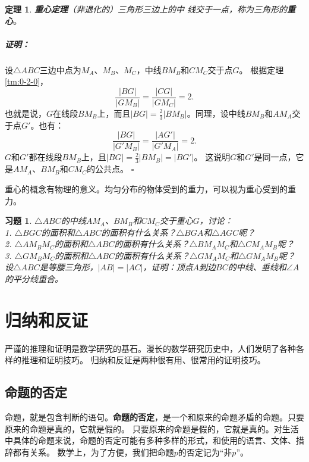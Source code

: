 \documentclass[12pt,UTF8]{ctexbook}
\newtheorem{tm}{定理}[section]
\newenvironment{proof2}{\paragraph{\textbf{证明：}}}{\hfill$\square$}
\newtheorem{xt}{习题}[section]
\begin{document}
\begin{tm}{\textbf{重心定理}}\label{tm:1-3-0}
    （非退化的）三角形三边上的中
    线交于一点，称为三角形的\textbf{重心}。
\end{tm}
\begin{proof2}
    设$\triangle ABC$三边中点为$M_A$、$M_B$、$M_C$，中线$BM_B$和$CM_C$交于点$G$。
    根据定理\ref{tm:0-2-0}，
    $$\frac{|BG|}{|GM_B|} = \frac{|CG|}{|GM_C|} = 2.$$
    也就是说，$G$在线段$BM_B$上，而且$|BG| = \frac23 |BM_B|$。同理，设中线$BM_B$和$AM_A$交于点$G'$。也有：
    $$\frac{|BG|}{|G'M_B|} = \frac{|AG'|}{|G'M_A|} = 2.$$
    $G$和$G'$都在线段$BM_B$上，且$|BG| = \frac23 |BM_B| = |BG'|$。
    这说明$G$和$G'$是同一点，它是$AM_A$、$BM_B$和$CM_C$的公共点。
\end{proof2}

重心的概念有物理的意义。均匀分布的物体受到的重力，可以视为重心受到的重力。
\begin{xt}\label{xt:1-3-0}
    $\triangle ABC$的中线$AM_A$、$BM_B$和$CM_C$交于重心$G$，讨论：\\
    1. $\triangle BGC$的面积和$\triangle ABC$的面积有什么关系？$\triangle BGA$和$\triangle AGC$呢？\\
    2. $\triangle AM_BM_C$的面积和$\triangle ABC$的面积有什么关系？$\triangle BM_AM_C$和$\triangle CM_AM_B$呢？\\
    3. $\triangle GM_BM_C$的面积和$\triangle ABC$的面积有什么关系？$\triangle GM_AM_C$和$\triangle GM_AM_B$呢？\\
    设$\triangle ABC$是等腰三角形，$|AB| = |AC|$，证明：顶点$A$到边$BC$的中线、垂线和$\angle A$的平分线重合。\\
\end{xt}

\chapter{归纳和反证}
严谨的推理和证明是数学研究的基石。漫长的数学研究历史中，人们发明了各种各样的推理和证明技巧。
归纳和反证是两种很有用、很常用的证明技巧。

\section{命题的否定}
命题，就是包含判断的语句。\textbf{命题的否定}，是一个和原来的命题矛盾的命题。只要原来的命题是真的，它就是假的。
只要原来的命题是假的，它就是真的。对生活中具体的命题来说，命题的否定可能有多种多样的形式，和使用的语言、文体、措辞都有关系。
数学上，为了方便，我们把命题$p$的否定记为“非$p$”。
\end{document}
